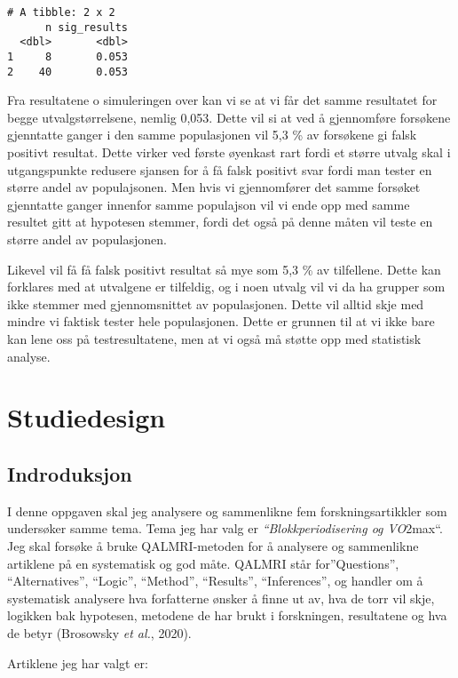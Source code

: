 \documentclass[
  letterpaper,
  DIV=11,
  numbers=noendperiod]{scrreprt}
\begin{document}
\begin{verbatim}
# A tibble: 2 x 2
      n sig_results
  <dbl>       <dbl>
1     8       0.053
2    40       0.053
\end{verbatim}

Fra resultatene o simuleringen over kan vi se at vi får det samme
resultatet for begge utvalgstørrelsene, nemlig 0,053. Dette vil si at
ved å gjennomføre forsøkene gjenntatte ganger i den samme populasjonen
vil 5,3 \% av forsøkene gi falsk positivt resultat. Dette virker ved
første øyenkast rart fordi et større utvalg skal i utgangspunkte
redusere sjansen for å få falsk positivt svar fordi man tester en større
andel av populajsonen. Men hvis vi gjennomfører det samme forsøket
gjenntatte ganger innenfor samme populajson vil vi ende opp med samme
resultet gitt at hypotesen stemmer, fordi det også på denne måten vil
teste en større andel av populasjonen.

Likevel vil få få falsk positivt resultat så mye som 5,3 \% av
tilfellene. Dette kan forklares med at utvalgene er tilfeldig, og i noen
utvalg vil vi da ha grupper som ikke stemmer med gjennomsnittet av
populasjonen. Dette vil alltid skje med mindre vi faktisk tester hele
populasjonen. Dette er grunnen til at vi ikke bare kan lene oss på
testresultatene, men at vi også må støtte opp med statistisk analyse.


\chapter{Studiedesign}\label{studiedesign}

\section{Indroduksjon}\label{indroduksjon}

I denne oppgaven skal jeg analysere og sammenlikne fem
forskningsartikkler som undersøker samme tema. Tema jeg har valg er
\emph{``Blokkperiodisering og VO}2max``. Jeg skal forsøke å bruke
QALMRI-metoden for å analysere og sammenlikne artiklene på en
systematisk og god måte. QALMRI står for''Questions'', ``Alternatives'',
``Logic'', ``Method'', ``Results'', ``Inferences'', og handler om å
systematisk analysere hva forfatterne ønsker å finne ut av, hva de torr
vil skje, logikken bak hypotesen, metodene de har brukt i forskningen,
resultatene og hva de betyr (Brosowsky \emph{et al.}, 2020).

Artiklene jeg har valgt er:
\end{document}
